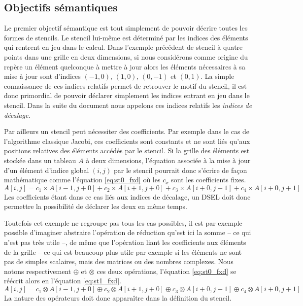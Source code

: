 \subsection{Objectifs sémantiques}

Le premier objectif sémantique est tout simplement de pouvoir décrire toutes les formes de stencils. Le stencil lui-même est déterminé par les indices des éléments qui rentrent en jeu dans le calcul. Dans l'exemple précédent de stencil à quatre points dans une grille en deux dimensions, si nous considérons comme origine du repère un élément quelconque à mettre à jour alors les éléments nécessaires à sa mise à jour sont d'indices $(-1,0)$, $(1,0)$, $(0,-1)$ et $(0,1)$. La simple connaissance de ces indices relatifs permet de retrouver le motif du stencil, il est donc primordial de pouvoir déclarer simplement les indices entrant en jeu dans le stencil. Dans la suite du document nous appelons ces indices relatifs les \emph{indices de décalage}.

Par ailleurs un stencil peut nécessiter des coefficients. Par exemple dans le cas de l'algorithme classique Jacobi, ces coefficients sont constants et ne sont liés qu'aux positions relatives des éléments accédés par le stencil. Si la grille des éléments est stockée dans un tableau $A$ à deux dimensions, l'équation associée à la mise à jour d'un élément d'indice global $(i,j)$ par le stencil pourrait donc s'écrire de façon mathématique comme l'équation \ref{eq:st0_fxd} où les $c_x$ sont les coefficients fixes.
\begin{equation}
\label{eq:st0_fxd}
A[i,j] = c_1 \times A[i-1,j+0] + c_2 \times A[i+1,j+0] + c_3 \times A[i+0,j-1] + c_4 \times A[i+0,j+1]
\end{equation}
Les coefficients étant dans ce cas liés aux indices de décalage, un DSEL doit donc permettre la possibilité de déclarer les deux en même temps.

Toutefois cet exemple ne regroupe pas tous les cas possibles, il est par exemple possible d'imaginer abstraire l'opération de réduction qu'est ici la somme -- ce qui n'est pas très utile --, de même que l'opération liant les coefficients aux éléments de la grille -- ce qui est beaucoup plus utile par exemple si les éléments ne sont pas de simples scalaires, mais des matrices ou des nombres complexes. Nous notons respectivement $\oplus$ et $\otimes$ ces deux opérations, l'équation \ref{eq:st0_fxd} se réécrit alors en l'équation \ref{eq:st1_fxd}.
\begin{equation}
\label{eq:st1_fxd}
A[i,j] = c_1 \otimes A[i-1,j+0] \oplus c_2 \otimes A[i+1,j+0] \oplus c_3 \otimes A[i+0,j-1] \oplus c_4 \otimes A[i+0,j+1]
\end{equation}
La nature des opérateurs doit donc apparaître dans la définition du stencil.

